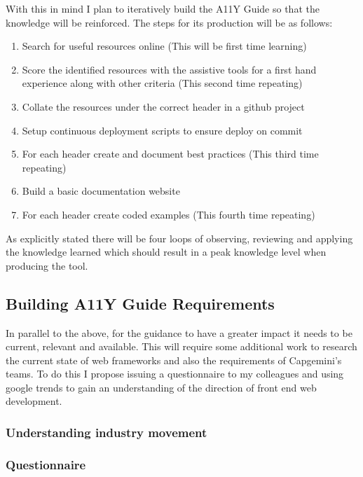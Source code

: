 With this in mind I plan to iteratively build the A11Y Guide so
that the knowledge will be reinforced. The steps for its production will be
as follows:
\begin{enumerate}
  \item Search for useful resources online (This will be first time learning)
  \item Score the identified resources with the assistive tools for a first hand
  experience along with other criteria (This second time repeating)
  \item Collate the resources under the correct header in a github project
  \item Setup continuous deployment scripts to ensure deploy on commit
  \item For each header create and document best practices (This third time
  repeating)
  \item Build a basic documentation website
  \item For each header create coded examples (This fourth time repeating)
\end{enumerate}

As explicitly stated there will be four loops of observing, reviewing and
applying the knowledge learned which should result in a peak knowledge level
when producing the tool.

\subsection{Building A11Y Guide Requirements}
In parallel to the above, for the guidance to have a greater impact it
needs to be current, relevant and available. This will require some additional
work to research the current state of web frameworks and also the
requirements of Capgemini's teams. To do this I propose issuing a
questionnaire to my colleagues and using google trends to gain an
understanding of the direction
of front end web development.

\subsubsection{Understanding industry movement}

\subsubsection{Questionnaire}

